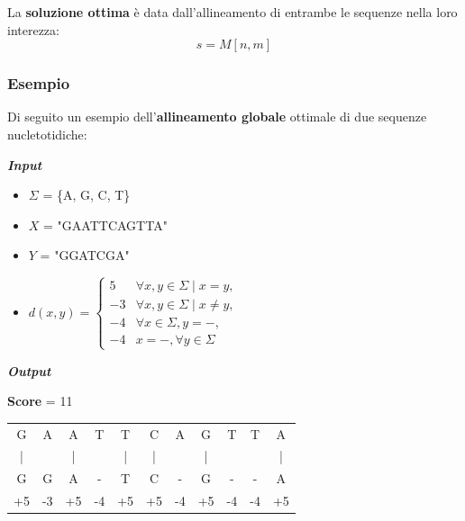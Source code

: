     La \textbf{soluzione ottima} è data dall'allineamento di entrambe le sequenze nella loro interezza: 
    \begin{equation}
        s = M[n, m]
    \end{equation}
    
\subsubsection{Esempio}
    Di seguito un esempio dell'\textbf{allineamento globale} ottimale di due sequenze nucletotidiche:
    
    \vspace{20pt}
    \noindent \textbf{\textit{Input}}
    \begin{itemize}
        \item $\Sigma$ = \{A, G, C, T\} 
        \item $X$ = "GAATTCAGTTA"
        \item $Y$ = "GGATCGA"
        \item $d(x, y) = \begin{cases}
            5 & \forall x, y \in \Sigma \mid x = y, \\
            -3 & \forall x, y \in \Sigma \mid x \neq y, \\
            -4 & \forall x \in \Sigma, y = -, \\
            -4 & x = -, \forall y \in \Sigma
        \end{cases}$
    \end{itemize}
    
    \noindent
    \textbf{\textit{Output}}
    
    \centering \textbf{Score} = 11
    \vspace{20pt}
    \begin{table}[h]
        \centering
        \begin{tabular}{ccccccccccc}
             G & A & A & T & T & C & A & G & T & T & A \\
             | &   & | &   & | & | &   & | &   &   & | \\
             G & G & A & - & T & C & - & G & - & - & A \\
             \hline
             +5 & -3 & +5 & -4 & +5 & +5 & -4 & +5 & -4 & -4 & +5 \\
             \hline
        \end{tabular}
    \end{table}
    \vspace{20pt}

